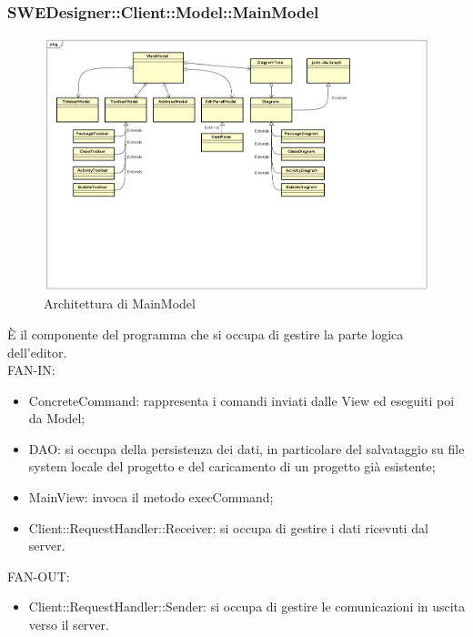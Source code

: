 \documentclass[../PianoDiQualifica.tex]{subfiles}
\begin{document}
		\subsubsection{SWEDesigner::Client::Model::MainModel}
			\begin{figure}[H]\label{fig:MainModel}
				\centering
				\includegraphics[scale=0.46]{Immagini/DiagrammaArchitettura/MainModel.png}
				\caption{Architettura di MainModel}
			\end{figure}
		È il componente del programma che si occupa di gestire la parte logica dell’editor.\\
		FAN-IN:
		\begin{itemize}
			\item ConcreteCommand: rappresenta i comandi inviati dalle View ed eseguiti poi da Model;
			\item DAO: si occupa della persistenza dei dati, in particolare del salvataggio su file system locale del progetto e del caricamento di un progetto già esistente;
			\item MainView: invoca il metodo execCommand;
			\item Client::RequestHandler::Receiver: si occupa di gestire i dati ricevuti dal server.
		\end{itemize}
		FAN-OUT:
		\begin{itemize}
			\item Client::RequestHandler::Sender: si occupa di gestire le comunicazioni in uscita verso il server.
		\end{itemize}
\end{document}
